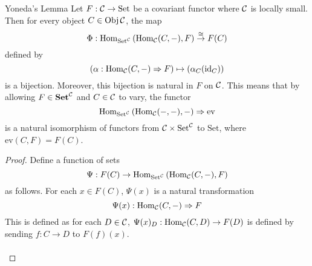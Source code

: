\documentclass[a4paper]{article}
\begin{document}
\begin{thm}{Yoneda's Lemma}{} Let $F:\mathcal{C}\to\text{Set}$ be a covariant functor where $\mathcal{C}$ is locally small. Then for every object $C\in\operatorname{Obj}\mathcal{C}$, the map $$\Phi:\operatorname{Hom}_{\text{Set}^{\mathcal{C}}}\left(\operatorname{Hom}_{\mathcal{C}}(C,-),F\right)\overset{\cong}{\rightarrow}F(C)$$ defined by $$\left(\alpha:\operatorname{Hom}_{\mathcal{C}}(C,-)\Rightarrow F\right)\mapsto\left(\alpha_C(\text{id}_C)\right)$$ is a bijection. Moreover, this bijection is natural in $F$ on $\mathcal{C}$. This means that by allowing $F\in\bold{Set}^{\mathcal{C}}$ and $C\in\mathcal{C}$ to vary, the functor $$\operatorname{Hom}_{\text{Set}^{\mathcal{C}}}\left(\operatorname{Hom}_{\mathcal{C}}(-,-),-\right)\Rightarrow\text{ev}$$ is a natural isomorphism of functors from $\mathcal{C}\times\text{Set}^{\mathcal{C}}$ to $\text{Set}$, where $\text{ev}(C,F)=F(C)$. \tcbline
\begin{proof}
Define a function of sets $$\Psi:F(C)\to\operatorname{Hom}_{\text{Set}^{\mathcal{C}}}\left(\operatorname{Hom}_{\mathcal{C}}(C,-),F\right)$$ as follows. For each $x\in F(C)$, $\Psi(x)$ is a natural transformation $$\Psi(x):\operatorname{Hom}_{\mathcal{C}}(C,-)\Rightarrow F$$ This is defined as for each $D\in\mathcal{C}$, $\Psi(x)_D:\operatorname{Hom}_{\mathcal{C}}(C,D)\to F(D)$ is defined by sending $f:C\to D$ to $F(f)(x)$. \\~\\


\end{proof}
\end{thm}
\end{document}
